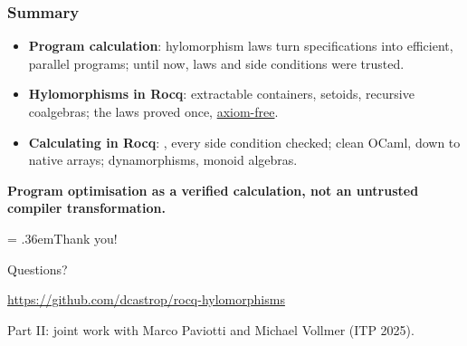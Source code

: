 \begin{frame}
  \frametitle{Summary}
  \begin{itemize}
    \item \textbf{Program calculation}: hylomorphism laws turn
      specifications into efficient, parallel programs; until now, laws
      and side conditions were trusted.
    \item \textbf{Hylomorphisms in Rocq}: extractable containers, setoids,
      recursive coalgebras; the laws proved once, \underline{axiom-free}.
    \item \textbf{Calculating in Rocq}: , every side condition
      checked; clean OCaml, down to native arrays; dynamorphisms, monoid
      algebras.
  \end{itemize}
  \begin{center}
    \textbf{Program optimisation as a verified calculation, not an
    untrusted compiler transformation.}
  \end{center}
\end{frame}

\begin{frame}
  \thispagestyle{talknofooter}
  \vfill
  \begin{center}
    \begin{minipage}{.75\textwidth}
      \begin{sticky}[halign = center]
        {\Huge\spaceskip = .36em\relax Thank you!\par}
        \bigskip
        {\large Questions?\par}
        \medskip
        \url{https://github.com/dcastrop/rocq-hylomorphisms}\par
        \medskip
        {\small Part II: joint work with Marco Paviotti and Michael
        Vollmer (ITP 2025).\par}
      \end{sticky}
    \end{minipage}
  \end{center}
  \vfill
\end{frame}
